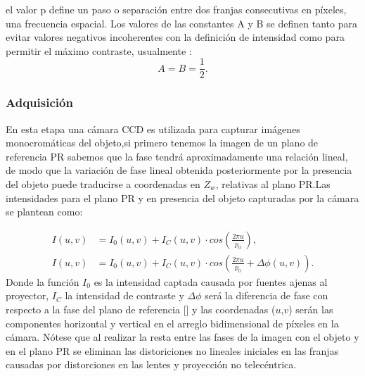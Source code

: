 \documentclass[UTF8]{article}
\begin{document}
el valor p define un paso o separación entre dos franjas consecutivas en píxeles, una frecuencia espacial. Los valores de las constantes A y B se definen tanto para evitar valores negativos incoherentes con la definición de intensidad como para permitir el máximo contraste, usualmente :
\medskip
\begin{equation}
A = B = \frac{1}{2}.    
\end{equation}

\subsubsection{Adquisición}

En esta etapa una cámara CCD es utilizada para capturar imágenes  monocromáticas del objeto,si primero tenemos la imagen de un plano de referencia PR sabemos que la fase tendrá aproximadamente una relación lineal, de modo que la variación de fase lineal obtenida posteriormente por la presencia del objeto  puede traducirse a coordenadas en $Z_{w}$, relativas al plano PR.Las intensidades para el plano PR y en presencia del objeto capturadas por la cámara se plantean como:
\medskip



\begin{align}
    I(u,v) &= I_{0}(u,v) + I_{C}(u,v)\cdot cos\left( \frac{2\pi u}{p_{0}}\right) ,
    \\
    I(u,v) &= I_{0}(u,v) + I_{C}(u,v)\cdot cos\left( \frac{2\pi u}{p_{0}}+ \Delta\phi(u,v)\right).
    \label{eq2}
\end{align}
Donde la función $I_{0}$ es la intensidad captada causada por fuentes ajenas al proyector, $I_{C}$ la intensidad de contraste y $\Delta\phi$ será la diferencia de fase con respecto a la fase del plano de referencia [] y las coordenadas ($u$,$v$) serán las componentes horizontal y vertical en el arreglo bidimensional de píxeles en la cámara. Nótese que al realizar la resta entre las fases de la imagen con el objeto y en el plano PR se eliminan las distoriciones no lineales iniciales en las franjas causadas por distorciones en las lentes y proyección no telecéntrica.
\medskip
\end{document}
